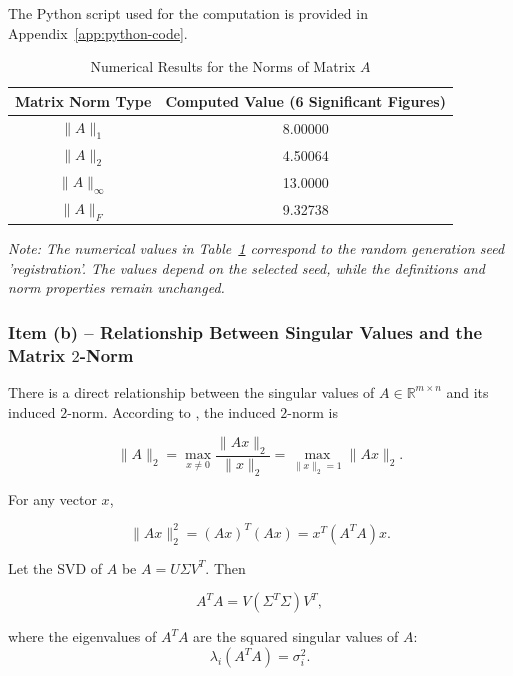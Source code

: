 The Python script used for the computation is provided in Appendix~\ref{app:python-code}.

\begin{table}[H]
\centering
\caption{Numerical Results for the Norms of Matrix $A$}
\label{tab:matrix_norms}
\begin{tabular}{cc}
\toprule
\textbf{Matrix Norm Type} & \textbf{Computed Value (6 Significant Figures)} \\ 
\midrule
$\|A\|_1$       & 8.00000 \\
$\|A\|_2$       & 4.50064 \\
$\|A\|_{\infty}$ & 13.0000 \\
$\|A\|_F$       & 9.32738 \\
\bottomrule
\end{tabular}
\end{table}

\textit{Note: The numerical values in Table~\ref{tab:matrix_norms} correspond to the random generation seed \textup{'registration'}. The values depend on the selected seed, while the definitions and norm properties remain unchanged.}

\subsubsection*{Item (b) -- Relationship Between Singular Values and the Matrix $2$-Norm}

There is a direct relationship between the singular values of $A\in\mathbb{R}^{m\times n}$ and its induced $2$-norm. According to \cite[Sections 2.3 and 2.4]{golub2013matrix}, the induced $2$-norm is

\begin{equation}
    \|A\|_2
    =\max_{x\neq0}\frac{\|Ax\|_2}{\|x\|_2}
    =\max_{\|x\|_2=1}\|Ax\|_2.
\end{equation}

For any vector $x$,

\begin{equation}
    \|Ax\|_2^2
    =(Ax)^T(Ax)
    =x^T(A^TA)x.
\end{equation}

Let the SVD of $A$ be $A=U\Sigma V^T$. Then

\begin{equation}
    A^TA
    =V(\Sigma^T\Sigma)V^T,
\end{equation}

where the eigenvalues of $A^TA$ are the squared singular values of $A$:
\begin{equation}
    \lambda_i(A^TA)=\sigma_i^2.
\end{equation}

